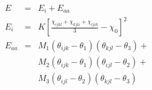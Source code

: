 \documentclass[12pt]{article}
\begin{document}
\begin{eqnarray*}
  E & = & E_i + E_{aa} \\
  E_i & = & K [ \frac{\chi_{ijkl} + \chi_{kjli} + \chi_{ljik}}{3} - \chi_0 ]^2 \\
  E_{aa} & = & M_1 (\theta_{ijk} - \theta_1) (\theta_{kjl} - \theta_3) + \\
  & & M_2 (\theta_{ijk} - \theta_1) (\theta_{ijl} - \theta_2) + \\
  & & M_3 (\theta_{ijl} - \theta_2) (\theta_{kjl} - \theta_3)
\end{eqnarray*}
\end{document}

